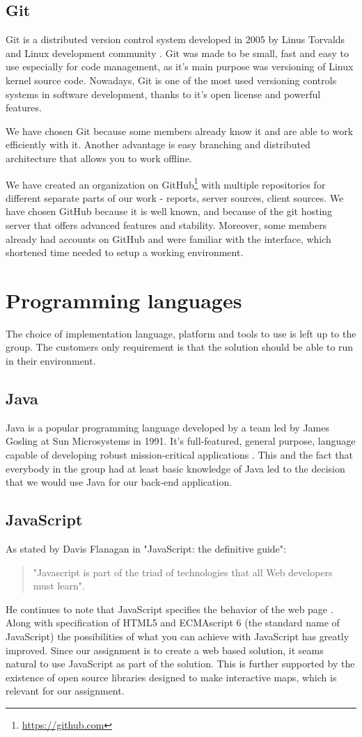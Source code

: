 \documentclass[11pt,a4paper,titlepage,oneside]{report}
\begin{document}
  \subsection{Git}
  Git is a distributed version control system developed in 2005 by Linus Torvalds and Linux development community \cite{ProGit}. Git was made to be small, fast and easy to use especially for code management, as it's main purpose was versioning of Linux kernel source code. Nowadays, Git is one of the most used versioning controls systems in software development, thanks to it's open license and powerful features.

  We have chosen Git because some members already know it and are able to work efficiently with it. Another advantage is easy branching and distributed architecture that allows you to work offline. 
  
  We have created an organization on GitHub\footnote{\url{https://github.com}} with multiple repositories for different separate parts of our work - reports, server sources, client sources. We have chosen GitHub because it is well known, and because of the git hosting server that offers advanced features and stability. Moreover, some members already had accounts on GitHub and were familiar with the interface, which shortened time needed to setup a working environment.

\section{Programming languages}
The choice of implementation language, platform and tools to use is left up to the group. The customers only requirement is that the solution should be able to run in their environment.
  \subsection{Java}
  Java is a popular programming language developed by a team led by James Gosling at Sun Microsystems in 1991. It's full-featured, general purpose, language capable of developing robust mission-critical applications \cite{liang}. This and the fact that everybody in the group had at least basic knowledge of Java led to the decision that we would use Java for our back-end application.  
  \subsection{JavaScript}
  As stated by Davis Flanagan in "JavaScript: the definitive guide": 
  \begin{quote}
  "Javascript is part of the triad of technologies that all Web developers must learn".
  \end{quote} 
  He continues to note that JavaScript specifies the behavior of the web page \cite{fd11}. Along with specification of HTML5 and ECMAscript 6 (the standard name of JavaScript) the possibilities of what you can achieve with JavaScript has greatly improved. Since our assignment is to create a web based solution, it seams natural to use JavaScript as part of the solution. This is further supported by the existence of open source libraries designed to make interactive maps, which is relevant for our assignment.
\end{document}
